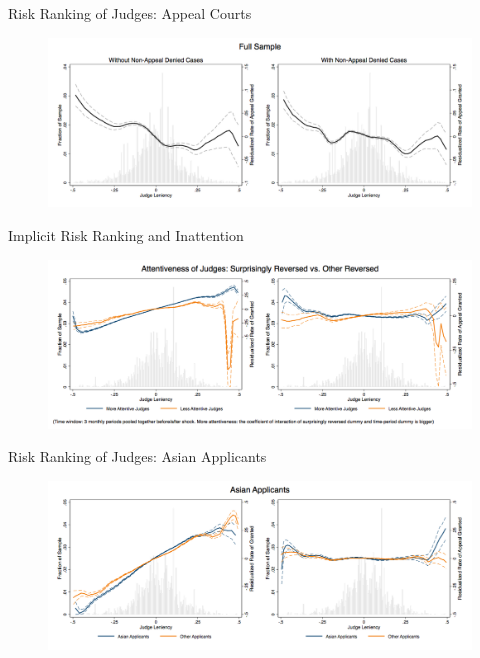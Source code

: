 \begin{frame}{Risk Ranking of Judges: Appeal Courts}
    \begin{figure}
        \centering
        \includegraphics[height = 0.7 \textheight]{images/stage2comp_full.png}
    \end{figure}
\end{frame}

\begin{frame}{Implicit Risk Ranking and Inattention}
    \begin{figure}
        \centering
        \includegraphics[height = 0.7 \textheight]{images/complete_surp_inattent.png}
    \end{figure}
    
\end{frame}

\begin{frame}{Risk Ranking of Judges: Asian Applicants}
    \begin{figure}
        \centering
        \includegraphics[height = 0.7 \textheight]{images/comp_asia.png}
    \end{figure}
\end{frame}

